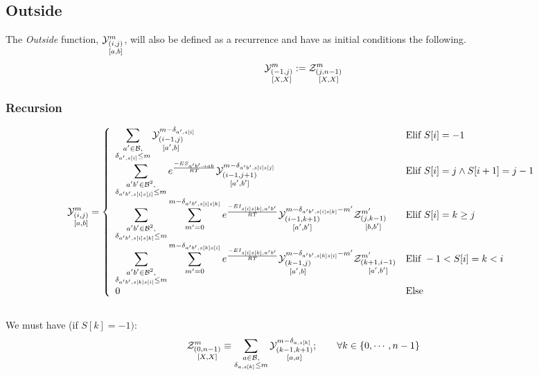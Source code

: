 \subsection{Outside}	
The \emph{Outside} function, $\Y{i,j}{m}{a,b}$, will also be defined as a recurrence and have 
as initial conditions the following.
$$
	\Y{-1,j}{m}{X,X}:=
		\displaystyle
	  \Z{j,n-1}{m}{X,X}
$$
\subsubsection{Recursion}
$$
	\Y{i,j}{m}{a,b} = \left\{
  \begin{array}{ll}
		\displaystyle
    \sum_{\substack{a'\in \B,\\ \Kron_{a',s[i]}\le m}}
    \Y{i-1,j}{m- \Kron_{a',s[i]}}{a',b} &
    \text{Elif }S[i]=-1 \\
    \displaystyle
    \sum_{\substack{a'b'\in \B^2,\\ \Kron_{a'b',s[i]s[j]}\le m}}
		 e^{\frac{-ES_{ a' b' \to a b }}{RT}}
    \Y{i-1,j+1}{m- \Kron_{a'b',s[i]s[j]}}{a',b'} &
   	 \text{Elif }S{[i]}=j \land S{[i+1]}=j-1\\
		 \displaystyle
		 \sum_{\substack{a'b'\in \B^2,\\ \Kron_{a'b',s[i]s[k]}\le m}}
		 \sum_{m'=0}^{m-\Kron_{a'b',s[i]s[k]}}
  		 e^{\frac{-EI_{s[i]s[k],a'b'}}{RT}}
		 \Y{i-1,k+1}{m- \Kron_{a'b',s[i]s[k]} - m'}{a',b'}
     \Z{j,k-1}{m'}{b,b'} &
		 \text{Elif }S{[i]}=k \geq j\\
		 \displaystyle
		 \sum_{\substack{a'b'\in \B^2,\\ \Kron_{a'b',s[k]s[i]}\le m}}
		 \sum_{m'=0}^{m-\Kron_{a'b',s[k]s[i]}}
  		 e^{\frac{-EI_{s[i]s[k],a'b'}}{RT}}
		 \Y{k-1,j}{m- \Kron_{a'b',s[k]s[i]} - m'}{a',b}
     \Z{k+1,i-1}{m'}{a',b'} &
		 \text{Elif }-1 < S{[i]}=k < i\\
		 0 & \text{Else}
  \end{array}\right.
$$
\subsection*{}
We must have (if $S[k] = -1)$:
$$
	\Z{0,n-1}{m}{X,X} \equiv     
	\sum_{\substack{a\in \B,\\ \Kron_{a,s[k]}\le m}}	
	\Y{k-1,k+1}{m-\Kron_{a,s[k]}}{a,a};\qquad
	\forall k \in \{0,\cdots,n-1\}
$$

